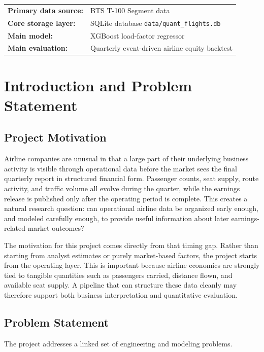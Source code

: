 \documentclass[11pt,a4paper]{article}
\begin{document}
\begin{titlepage}
\vfill
\begin{tabular}{ll}
\textbf{Primary data source:} & BTS T-100 Segment data \\
\textbf{Core storage layer:} & SQLite database \texttt{data/quant\_flights.db} \\
\textbf{Main model:} & XGBoost load-factor regressor \\
\textbf{Main evaluation:} & Quarterly event-driven airline equity backtest \\
\end{tabular}
\end{titlepage}

\tableofcontents
\newpage

\section{Introduction and Problem Statement}

\subsection{Project Motivation}

Airline companies are unusual in that a large part of their underlying business
activity is visible through operational data before the market sees the final
quarterly report in structured financial form. Passenger counts, seat supply,
route activity, and traffic volume all evolve during the quarter, while the
earnings release is published only after the operating period is complete. This
creates a natural research question: can operational airline data be organized
early enough, and modeled carefully enough, to provide useful information about
later earnings-related market outcomes?

The motivation for this project comes directly from that timing gap. Rather than
starting from analyst estimates or purely market-based factors, the project
starts from the operating layer. This is important because airline economics
are strongly tied to tangible quantities such as passengers carried, distance
flown, and available seat supply. A pipeline that can structure these data
cleanly may therefore support both business interpretation and quantitative
evaluation.

\subsection{Problem Statement}

The project addresses a linked set of engineering and modeling problems.
\end{document}
